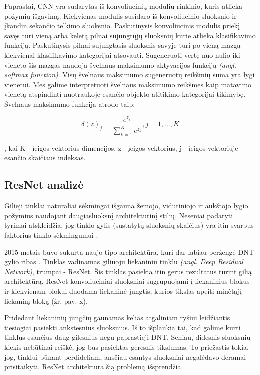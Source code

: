 \documentclass{VUMIFPSkursinis}
\begin{document}
Paprastai, CNN yra sudarytas iš konvoliucinių modulių rinkinio, kuris atlieka požymių išgavimą. Kiekvienas modulis susidaro iš konvoliucinio sluoksnio ir įkandin sekančio telkimo sluoksnio. Paskutinysis konvoliucinis modulis priekį savęs turi vieną arba keletą pilnai sujungtųjų sluoksnių kurie atlieka klasifikavimo funkciją. Paskutinysis pilnai sujungtasis sluoksnis savyje turi po vieną mazgą kiekvienai klasifikavimo kategorijai atsovauti. Sugeneruoti vertę nuo nulio iki vieneto šis mazgas naudoja švelnaus maksimumo aktyvacijos funkciją \textit{(angl. softmax function)}. Visų švelnaus maksimumo sugeneruotų reikšmių suma yra lygi vienetui. Mes galime interpretuoti švelnaus maksimumo reikšmes kaip matavimo vienetą atspindintį nuotraukoje esančio objekto atitikimo kategorijai tikimybę. \cite{TFMnist} Švelnaus maksimumo funkcija atrodo taip: 

\begin{equation}
  \delta(z)_j=\frac{e^{z_j}}{\sum_{k=1}^K e^{z_k}}, j = 1, …, K 
\end{equation}

, kai K - įeigos vektorius dimencijos, z - įeigos vektorius,  j - įeigos vektoriuje esančio skaičiaus indeksas.
\subsection{ResNet analizė}

Gilieji tinklai natūraliai sėkmingai išgauna žemojo, vidutiniojo ir aukštojo lygio požymius naudojant daugiasluoksnį architektūrinį stilių. Neseniai padaryti tyrimai atskleidžia, jog tinklo gylis (sustatytų sluoksnių skaičius) yra itin svarbus faktorius tinklo sėkmingumui \cite{VDCN, VDCN2}. 

2015 metais buvo sukurta naujo tipo architektūra, kuri dar labiau peržengė DNT gylio ribas \cite{REDNT}. Tinklas vadinamas giliuoju liekaniniu tinklu \textit{(angl. Deep Residual Network)}, trumpai - ResNet. Šis tinklas pasiekia itin gerus rezultatus turint gilią architektūrą. ResNet konvoliuciniai sluoksniai sugrupuojami į liekaninius blokus ir kiekvienam blokui duodama liekaninė jungtis, kurios tikslas apeiti minėtąjį liekaninį bloką (žr. pav. x). 

Pridedant liekaninių jungčių gaunamas kelias atgaliniam ryšiui leidžiantis tiesiogiai pasiekti ankstesnius sluoksnius. Iš to išplaukia tai, kad galime kurti tinklus esančius daug gilesnius negu paprastieji DNT. Seniau, didesnis sluoksnių kiekis nebūtinai reiškė, jog bus pasiektas geresnis tikslumas. To priežastis tokia, jog, tinklui būnant perdideliam, ansčiau esantys sluoksniai negalėdavo deramai prisitaikyti. ResNet architektūra šią problemą išsprendžia. \cite{Nont}
\end{document}
